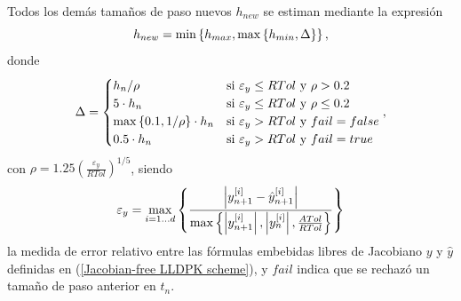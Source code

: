 Todos los demás tamaños de paso nuevos $h_{new}$ se estiman mediante la expresión
\begin{equation}
    h_{new} = \min\left\{ h_{max},\max\left\{ h_{min},\Delta \right\} \right\}, \label{hnewcalc-fj}
\end{equation}
donde
\begin{equation*}
    \Delta = \begin{cases}
        h_n/\rho & \text{si } \varepsilon_y\leq RTol \text{ y } \rho>0\mathord{.}2\\
        5\cdot h_n & \text{si } \varepsilon_y\leq RTol \text{ y } \rho\leq 0\mathord{.}2\\
        \max\left\{ 0\mathord{.}1,1/\rho \right\}\cdot h_n & \text{si } \varepsilon_y > RTol \text{ y } fail=false\\
        0\mathord{.}5\cdot h_n & \text{si } \varepsilon_y > RTol \text{ y } fail=true
        \end{cases},
\end{equation*}
con  $\rho = 1\mathord{.}25 \left( \frac{\varepsilon_y}{RTol} \right)^{1/5}$, siendo
\begin{equation}\label{epsilon_y-fj}
	\varepsilon_y =  \max_{i=1\ldots d}\left\{ \frac{\left\lvert y^{[i]}_{n+1}-\hat{y}^{[i]}_{n+1} \right\rvert}
	{\max\left\{ \left\lvert y^{[i]}_{n+1}  \right\rvert,\left\lvert y^{[i]}_{n}\right\rvert,\frac{ATol}{RTol} \right\}} \right\}
\end{equation}
la medida de error relativo entre las fórmulas embebidas libres de Jacobiano $y$ y $\hat y$ definidas en (\ref{Jacobian-free LLDPK scheme}), y $fail$ indica que se rechazó un tamaño de paso anterior en $t_n$.

